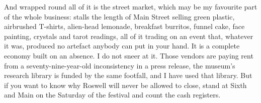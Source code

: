 And wrapped round all of it is the street market, which may be my favourite part of the whole
business: stalls the length of Main Street selling green plastic, airbrushed T-shirts, alien-head
lemonade, breakfast burritos, funnel cake, face painting, crystals and tarot readings, all of it
trading on an event that, whatever it was, produced no artefact anybody can put in your hand. It is a
complete economy built on an absence. I do not sneer at it. Those vendors are paying rent from a
seventy-nine-year-old inconsistency in a press release, the museum's research library is funded by the
same footfall, and I have used that library. But if you want to know why Roswell will never be allowed
to close, stand at Sixth and Main on the Saturday of the festival and count the cash registers.


